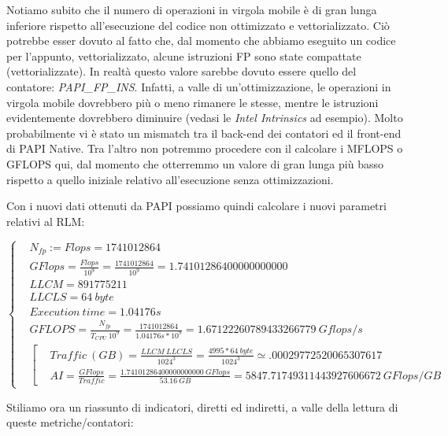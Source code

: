 Notiamo subito che il numero di operazioni in virgola mobile è di gran lunga inferiore rispetto all'esecuzione del codice non ottimizzato e vettorializzato. Ciò potrebbe esser dovuto al fatto che, dal momento che abbiamo eseguito un codice per l'appunto, vettorializzato, alcune istruzioni FP sono state compattate (vettorializzate). In realtà questo valore sarebbe dovuto essere quello del contatore: \textit{PAPI\_FP\_INS}. Infatti, a valle di un'ottimizzazione, le operazioni in virgola mobile dovrebbero più o meno rimanere le stesse, mentre le istruzioni evidentemente dovrebbero diminuire (vedasi le \textit{Intel Intrinsics} ad esempio). Molto probabilmente vi è stato un mismatch tra il back-end dei contatori ed il front-end di {PAPI Native}. Tra l'altro non potremmo procedere con il calcolare i MFLOPS o GFLOPS qui, dal momento che otterremmo un valore di gran lunga più basso rispetto a quello iniziale relativo all'esecuzione senza ottimizzazioni.

Con i nuovi dati ottenuti da PAPI possiamo quindi calcolare i nuovi parametri relativi al RLM:
	
\[
	\left\{
	\begin{aligned}
	&N_{fp} := Flops = 1741012864\\
	&GFlops = \frac{Flops}{10^9} = \frac{1741012864}{10^9} = 1.74101286400000000000\\
	&LLCM = 891775211\\
	&LLCLS = 64\ byte\\
	&Execution\ time = 1.04176s\\
	&GFLOPS = \frac{N_{fp}}{T_{CPU}\ 10^9} = \frac{1741012864}{1.04176s*10^9} = 1.67122260789433266779\ Gflops/s\\
	&\left[
	\begin{aligned}
	&Traffic\ (GB) = \frac{LLCM\ LLCLS}{1024^3} = \frac{4995*64\ byte}{1024^3} \simeq .00029772520065307617\\
	&AI = \frac{GFlops}{Traffic} = \frac{1.74101286400000000000\ GFlops}{53.16\ GB} = 5847.71749311443927606672\ GFlops/GB
	\end{aligned}
	\right.
	\end{aligned}
	\right.
\]

Stiliamo ora un riassunto di indicatori, diretti ed indiretti, a valle della lettura di queste metriche/contatori:


